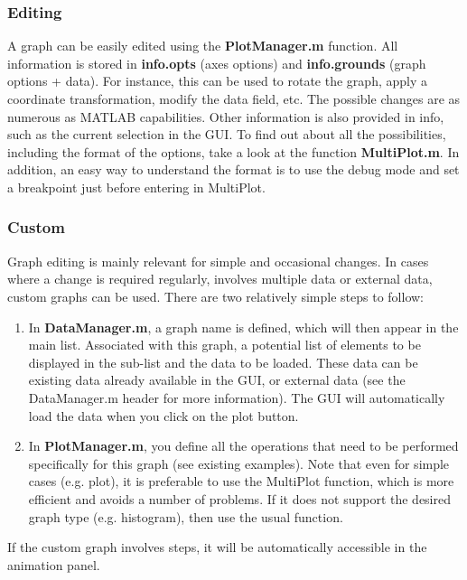 \documentclass{article}
\begin{document}
\subsubsection{Editing}

A graph can be easily edited using the \textbf{PlotManager.m} function. All information is stored in \textbf{info.opts} (axes options) and \textbf{info.grounds} (graph options + data). For instance, this can be used to rotate the graph, apply a coordinate transformation, modify the data field, etc. The possible changes are as numerous as MATLAB capabilities. Other information is also provided in info, such as the current selection in the GUI. To find out about all the possibilities, including the format of the options, take a look at the function \textbf{MultiPlot.m}. In addition, an easy way to understand the format is to use the debug mode and set a breakpoint just before entering in MultiPlot.

\subsubsection{Custom}

Graph editing is mainly relevant for simple and occasional changes. In cases where a change is required regularly, involves multiple data or external data, custom graphs can be used. There are two relatively simple steps to follow:

\begin{enumerate}
    \item In \textbf{DataManager.m}, a graph name is defined, which will then appear in the main list. Associated with this graph, a potential list of elements to be displayed in the sub-list and the data to be loaded. These data can be existing data already available in the GUI, or external data (see the DataManager.m header for more information). The GUI will automatically load the data when you click on the plot button. 
    \item In \textbf{PlotManager.m}, you define all the operations that need to be performed specifically for this graph (see existing examples). Note that even for simple cases (e.g. plot), it is preferable to use the MultiPlot function, which is more efficient and avoids a number of problems. If it does not support the desired graph type (e.g. histogram), then use the usual function.
\end{enumerate}

If the custom graph involves steps, it will be automatically accessible in the animation panel.
\end{document}
